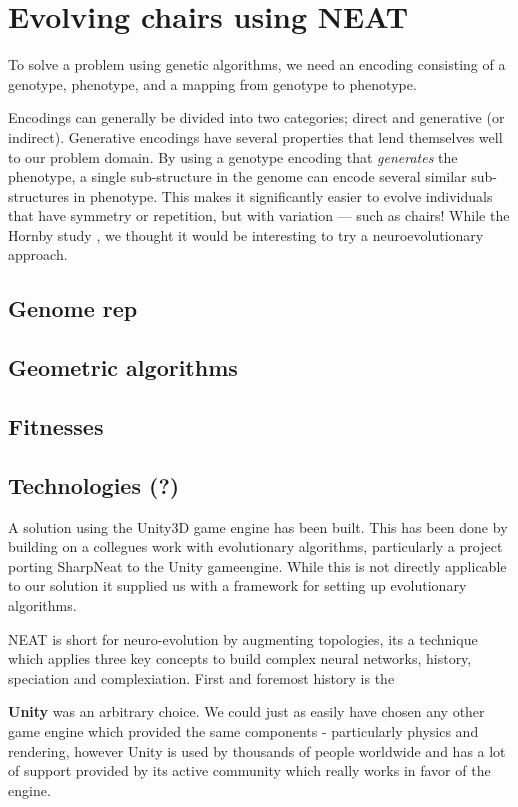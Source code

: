 \section{Evolving chairs using NEAT}
To solve a problem using genetic algorithms, we need an encoding
consisting of a genotype, phenotype, and a mapping from genotype to phenotype.

Encodings can generally be divided into two categories; direct and generative
(or indirect). Generative encodings have several properties that lend themselves
well to our problem domain. By using a genotype encoding that \textit{generates}
the phenotype, a single sub-structure in the genome can encode several similar
sub-structures in phenotype. This makes it significantly easier to evolve
individuals that have symmetry or repetition, but with variation --- such as
chairs! While the Hornby study \cite{paper:ev4}, we thought it would be
interesting to try a neuroevolutionary approach.

\subsection{Genome rep}
\subsection{Geometric algorithms}
\subsection{Fitnesses}
\subsection{Technologies (?)}

A solution using the Unity3D\cite{web:unity} game engine has been built. This has been done by building on a collegues work with evolutionary algorithms, particularly a project porting SharpNeat\cite{web:unityneat} to the Unity gameengine\cite{web:sharpneat}. While this is not directly applicable to our solution it supplied us with a framework for setting up evolutionary algorithms.

NEAT is short for neuro-evolution by augmenting topologies, its a technique which applies three key concepts to build complex neural networks, history, speciation and complexiation. First and foremost history is the 
    
\textbf{Unity} was an arbitrary choice. We could just as easily have chosen any other game engine which provided the same components - particularly physics and rendering, however Unity is used by thousands of people worldwide and has a lot of support provided by its active community which really works in favor of the engine.


